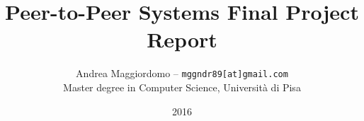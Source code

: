 \documentclass[a4paper, 11pt]{article}
\title{Peer-to-Peer Systems Final Project Report}
\author{Andrea Maggiordomo -- \texttt{mggndr89[at]gmail.com} \\[1mm] Master degree in Computer Science, Universit\`a di Pisa}
\date{2016}
\begin{document}


\maketitle









{}
\end{document}

